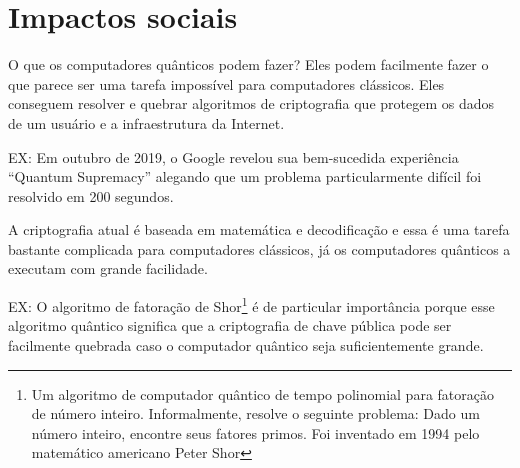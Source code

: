 \section{Impactos sociais}
O que os computadores quânticos podem fazer?  Eles podem facilmente fazer o que parece ser uma tarefa impossível para computadores clássicos. Eles conseguem resolver e quebrar algoritmos de criptografia que protegem os dados de um usuário e a infraestrutura da Internet.  

EX: Em outubro de 2019, o Google revelou sua bem-sucedida experiência ``Quantum Supremacy'' alegando que um problema particularmente difícil foi resolvido em 200 segundos. \cite{15}

A criptografia atual é baseada em matemática e decodificação e essa é uma tarefa bastante complicada para computadores clássicos, já os computadores quânticos a executam com grande facilidade. 

EX: O algoritmo de fatoração de Shor\footnote{Um algoritmo de computador quântico de tempo polinomial para fatoração de número inteiro. Informalmente, resolve o seguinte problema: Dado um número inteiro, encontre seus fatores primos. Foi inventado em 1994 pelo matemático americano Peter Shor} é de particular importância porque esse algoritmo quântico significa que a criptografia de chave pública pode ser facilmente quebrada caso o computador quântico seja suficientemente grande.
\newpage